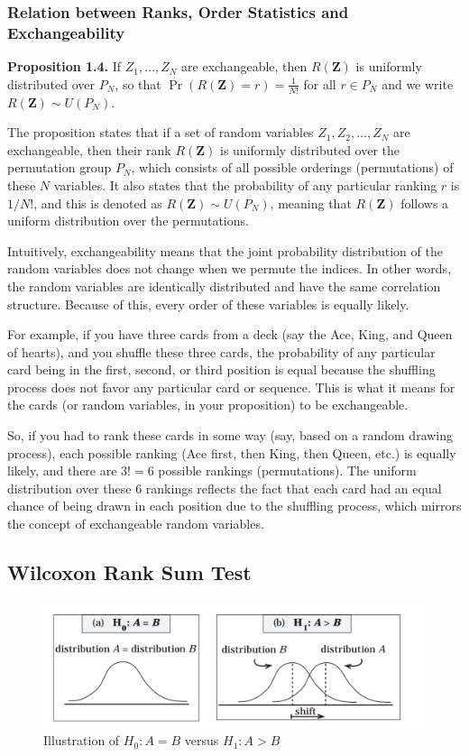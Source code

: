 \documentclass{article}
\begin{document}
\subsubsection{Relation between Ranks, Order Statistics and Exchangeability}
\textbf{Proposition 1.4.} If \( Z_1, \ldots, Z_N \) are exchangeable, then \( R(\mathbf{Z}) \) is uniformly distributed over \( P_N \), so that \( \Pr(R(\mathbf{Z}) = r) = \frac{1}{N!} \) for all \( r \in P_N \) and we write \( R(\mathbf{Z}) \sim U(P_N) \).

The proposition states that if a set of random variables \( Z_1, Z_2, \ldots, Z_N \) are exchangeable, then their rank \( R(\mathbf{Z}) \) is uniformly distributed over the permutation group \( P_N \), which consists of all possible orderings (permutations) of these \( N \) variables. It also states that the probability of any particular ranking \( r \) is \( 1/N! \), and this is denoted as \( R(\mathbf{Z}) \sim U(P_N) \), meaning that \( R(\mathbf{Z}) \) follows a uniform distribution over the permutations.

Intuitively, exchangeability means that the joint probability distribution of the random variables does not change when we permute the indices. In other words, the random variables are identically distributed and have the same correlation structure. Because of this, every order of these variables is equally likely.

For example, if you have three cards from a deck (say the Ace, King, and Queen of hearts), and you shuffle these three cards, the probability of any particular card being in the first, second, or third position is equal because the shuffling process does not favor any particular card or sequence. This is what it means for the cards (or random variables, in your proposition) to be exchangeable.

So, if you had to rank these cards in some way (say, based on a random drawing process), each possible ranking (Ace first, then King, then Queen, etc.) is equally likely, and there are \( 3! = 6 \) possible rankings (permutations). The uniform distribution over these 6 rankings reflects the fact that each card had an equal chance of being drawn in each position due to the shuffling process, which mirrors the concept of exchangeable random variables.

\subsection{Wilcoxon Rank Sum Test}
\begin{figure}
    \centering
    \includegraphics[width=1\linewidth]{figures/wilcox-dist.png}
    \caption{Illustration of $H_0 : A = B$ versus $H_1 : A>B$}
    \label{fig:enter-label}
\end{figure}
\end{document}
